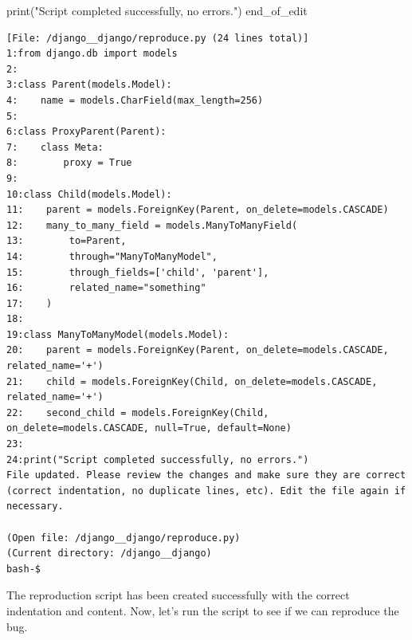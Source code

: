{\begin{agentbox}
\begin{CodeVerbatim}[breaklines=true, breakanywhere=true]
print("Script completed successfully, no errors.")
end_of_edit
\end{CodeVerbatim}
\end{agentbox}
\begin{observationbox}\begin{Verbatim}[breaklines=true, breakanywhere=true]
[File: /django__django/reproduce.py (24 lines total)]
1:from django.db import models
2:
3:class Parent(models.Model):
4:    name = models.CharField(max_length=256)
5:
6:class ProxyParent(Parent):
7:    class Meta:
8:        proxy = True
9:
10:class Child(models.Model):
11:    parent = models.ForeignKey(Parent, on_delete=models.CASCADE)
12:    many_to_many_field = models.ManyToManyField(
13:        to=Parent,
14:        through="ManyToManyModel",
15:        through_fields=['child', 'parent'],
16:        related_name="something"
17:    )
18:
19:class ManyToManyModel(models.Model):
20:    parent = models.ForeignKey(Parent, on_delete=models.CASCADE, related_name='+')
21:    child = models.ForeignKey(Child, on_delete=models.CASCADE, related_name='+')
22:    second_child = models.ForeignKey(Child, on_delete=models.CASCADE, null=True, default=None)
23:
24:print("Script completed successfully, no errors.")
File updated. Please review the changes and make sure they are correct (correct indentation, no duplicate lines, etc). Edit the file again if necessary.

(Open file: /django__django/reproduce.py)
(Current directory: /django__django)
bash-$
\end{Verbatim}
\end{observationbox}
\begin{agentbox}
The reproduction script has been created successfully with the correct indentation and content. Now, let's run the script to see if we can reproduce the bug.




\end{agentbox}}
